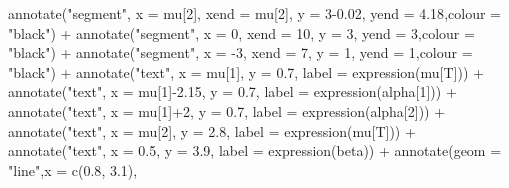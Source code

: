 \documentclass[
]{book}
\newenvironment{Shaded}{\begin{snugshade}}{\end{snugshade}}
\newcommand{\AttributeTok}[1]{\textcolor[rgb]{0.77,0.63,0.00}{#1}}
\newcommand{\DecValTok}[1]{\textcolor[rgb]{0.00,0.00,0.81}{#1}}
\newcommand{\FloatTok}[1]{\textcolor[rgb]{0.00,0.00,0.81}{#1}}
\newcommand{\FunctionTok}[1]{\textcolor[rgb]{0.00,0.00,0.00}{#1}}
\newcommand{\NormalTok}[1]{#1}
\newcommand{\SpecialCharTok}[1]{\textcolor[rgb]{0.00,0.00,0.00}{#1}}
\newcommand{\StringTok}[1]{\textcolor[rgb]{0.31,0.60,0.02}{#1}}
\begin{document}
\begin{Shaded}
\begin{Highlighting}[]
  \FunctionTok{annotate}\NormalTok{(}\StringTok{"segment"}\NormalTok{, }\AttributeTok{x =}\NormalTok{ mu[}\DecValTok{2}\NormalTok{], }\AttributeTok{xend =}\NormalTok{ mu[}\DecValTok{2}\NormalTok{], }\AttributeTok{y =} \DecValTok{3}\FloatTok{{-}0.02}\NormalTok{, }\AttributeTok{yend =} \FloatTok{4.18}\NormalTok{,}\AttributeTok{colour =} \StringTok{"black"}\NormalTok{) }\SpecialCharTok{+}
  \FunctionTok{annotate}\NormalTok{(}\StringTok{"segment"}\NormalTok{, }\AttributeTok{x =} \DecValTok{0}\NormalTok{, }\AttributeTok{xend =} \DecValTok{10}\NormalTok{, }\AttributeTok{y =} \DecValTok{3}\NormalTok{, }\AttributeTok{yend =} \DecValTok{3}\NormalTok{,}\AttributeTok{colour =} \StringTok{"black"}\NormalTok{) }\SpecialCharTok{+}
  \FunctionTok{annotate}\NormalTok{(}\StringTok{"segment"}\NormalTok{, }\AttributeTok{x =} \SpecialCharTok{{-}}\DecValTok{3}\NormalTok{, }\AttributeTok{xend =} \DecValTok{7}\NormalTok{, }\AttributeTok{y =} \DecValTok{1}\NormalTok{, }\AttributeTok{yend =} \DecValTok{1}\NormalTok{,}\AttributeTok{colour =} \StringTok{"black"}\NormalTok{) }\SpecialCharTok{+}
  \FunctionTok{annotate}\NormalTok{(}\StringTok{"text"}\NormalTok{, }\AttributeTok{x =}\NormalTok{ mu[}\DecValTok{1}\NormalTok{], }\AttributeTok{y =} \FloatTok{0.7}\NormalTok{, }\AttributeTok{label =} \FunctionTok{expression}\NormalTok{(mu[T])) }\SpecialCharTok{+}
  \FunctionTok{annotate}\NormalTok{(}\StringTok{"text"}\NormalTok{, }\AttributeTok{x =}\NormalTok{ mu[}\DecValTok{1}\NormalTok{]}\SpecialCharTok{{-}}\FloatTok{2.15}\NormalTok{, }\AttributeTok{y =} \FloatTok{0.7}\NormalTok{, }\AttributeTok{label =} \FunctionTok{expression}\NormalTok{(alpha[}\DecValTok{1}\NormalTok{])) }\SpecialCharTok{+} 
  \FunctionTok{annotate}\NormalTok{(}\StringTok{"text"}\NormalTok{, }\AttributeTok{x =}\NormalTok{ mu[}\DecValTok{1}\NormalTok{]}\SpecialCharTok{+}\DecValTok{2}\NormalTok{, }\AttributeTok{y =} \FloatTok{0.7}\NormalTok{, }\AttributeTok{label =} \FunctionTok{expression}\NormalTok{(alpha[}\DecValTok{2}\NormalTok{])) }\SpecialCharTok{+}
  \FunctionTok{annotate}\NormalTok{(}\StringTok{"text"}\NormalTok{, }\AttributeTok{x =}\NormalTok{ mu[}\DecValTok{2}\NormalTok{], }\AttributeTok{y =} \FloatTok{2.8}\NormalTok{, }\AttributeTok{label =} \FunctionTok{expression}\NormalTok{(mu[T])) }\SpecialCharTok{+}
  \FunctionTok{annotate}\NormalTok{(}\StringTok{"text"}\NormalTok{, }\AttributeTok{x =} \FloatTok{0.5}\NormalTok{, }\AttributeTok{y =} \FloatTok{3.9}\NormalTok{, }\AttributeTok{label =} \FunctionTok{expression}\NormalTok{(beta)) }\SpecialCharTok{+} 
  \FunctionTok{annotate}\NormalTok{(}\AttributeTok{geom =} \StringTok{"line"}\NormalTok{,}\AttributeTok{x =} \FunctionTok{c}\NormalTok{(}\FloatTok{0.8}\NormalTok{, }\FloatTok{3.1}\NormalTok{),}

\end{Highlighting}
\end{Shaded}
\end{document}
